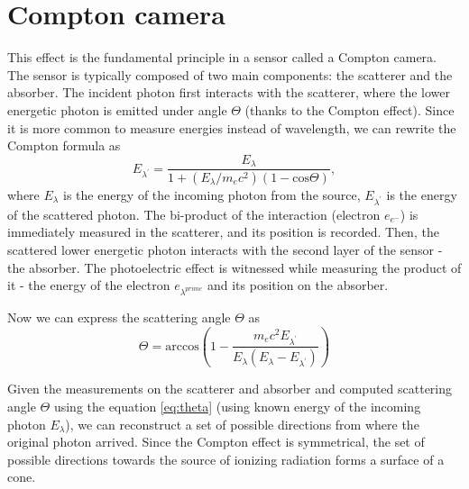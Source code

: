 \section{Compton camera}
This effect is the fundamental principle in a sensor called a Compton camera. 
The sensor is typically composed of two main components: the scatterer and the absorber. 
The incident photon first interacts with the scatterer, where the lower energetic photon is emitted under angle $\Theta$ (thanks to the Compton effect). 
Since it is more common to measure energies instead of wavelength, we can rewrite the Compton formula as
\begin{equation}
E_{\lambda^{\prime}} = \frac{E_{\lambda}}{  1 + (E_{\lambda} / m_{e}c^{2}) (1 - \mathrm{cos} \Theta)},
\end{equation}
where $E_{\lambda}$ is the energy of the incoming photon from the source, $E_{\lambda^{\prime}}$ is the energy of the scattered photon.  
The bi-product of the interaction (electron $e_{e^{-}}$) is immediately measured in the scatterer, and its position is recorded.
Then, the scattered lower energetic photon interacts with the second layer of the sensor - the absorber. 
The photoelectric effect is witnessed while measuring the product of it - the energy of the electron $e_{\lambda^{prime}}$ and its position on the absorber.

Now we can express the scattering angle $\Theta$ as
\begin{equation}
    \Theta = \mathrm{arccos} \left (  1-\frac{m_{e}c^{2}E_{\lambda^{\prime}}}{E_{\lambda} (E_{\lambda} - E_{\lambda^{\prime}})} \right )
    \label{eq:theta}
\end{equation}

Given the measurements on the scatterer and absorber and computed scattering angle $\Theta$ using the equation \ref{eq:theta} (using known energy of the incoming photon $E_{\lambda}$), we can reconstruct a set of possible directions from where the original photon arrived. Since the Compton effect is symmetrical, the set of possible directions towards the source of ionizing radiation forms a surface of a cone.


